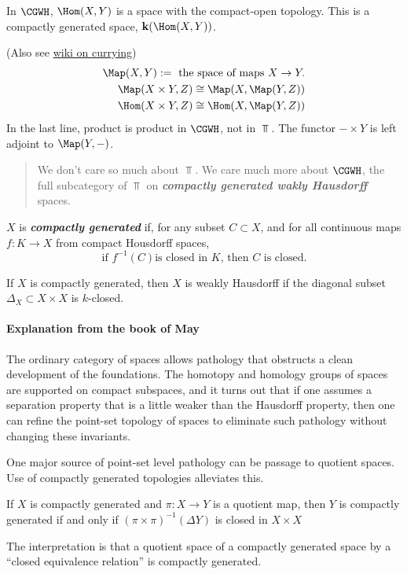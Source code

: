 	In $\CGWH$, $\Hom(X,Y)$ is a space with the compact-open topology. This is a compactly generated space, $\mathbf{k}(\Hom(X,Y))$.
\begin{remark}
	(Also see \href{https://en.wikipedia.org/wiki/Currying#Function_spaces}{wiki on currying})
	\begin{align*}
		\Map(X,Y):=\text{ the space of maps }X\to Y.\\
		\Map(X\times Y,Z)\cong\Map(X,\Map(Y,Z))\\
		\Hom(X\times Y,Z)\cong \Hom(X,\Map(Y,Z))
	\end{align*}
	In the last line, product is product in $\CGWH$, not in $\Top$.
	The functor $-\times Y$ is left adjoint to $\Map(Y,-)$.

\begin{quotation}
	We don't care so much about $\Top$. We care much more about $\CGWH$, the full subcategory of $\Top$ on \textbf{\textit{compactly generated wakly Hausdorff}} spaces.
\end{quotation}
\begin{defn}
	$X$ is \textbf{\textit{compactly generated}} if, for any subset $C\subset X$, and for all continuous maps $f:K\to X$ from compact Housdorff spaces, \[\text{if } f^{-1}(C) \text{is closed in }K\text{, then } C\text{ is closed}.\]
\end{defn}
\begin{claim}
	If $X$ is compactly generated, then $X$ is weakly Hausdorff if the diagonal subset $\Delta_X\subset X\times X$ is {\color{orange}$k$-closed}.
\end{claim}

\paragraph{Explanation from the book of May} The ordinary category of spaces allows pathology that obstructs a clean development of the foundations. The homotopy and homology groups of spaces are supported on compact subspaces, and it turns out that if one assumes a separation property that is a little weaker than the Hausdorff property, then one can refine the point-set topology of spaces to eliminate such pathology without changing these invariants.
	
	One major source of point-set level pathology can be passage to quotient spaces. Use of compactly generated topologies alleviates this.
	\begin{prop}
		If $X$ is compactly generated and $\pi:X\to Y$ is a quotient map, then $Y$ is compactly generated if and only if $(\pi\times \pi)^{-1}(\Delta Y)$ is closed in $X\times X$
	\end{prop}
	The interpretation is that a quotient space of a compactly generated space by a “closed equivalence relation” is compactly generated.


\end{remark}
